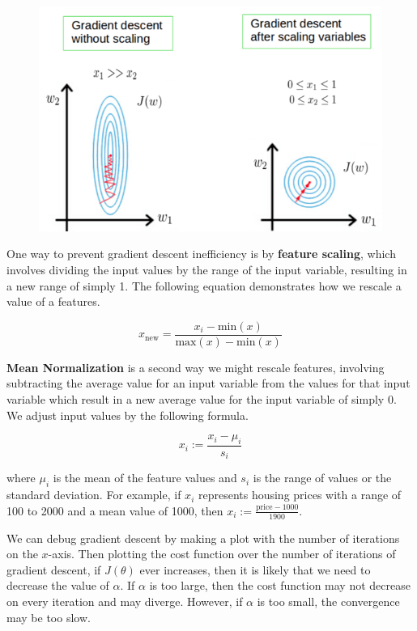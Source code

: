 \documentclass{article}
\begin{document}
        \begin{figure}[hbt!]
            \centering
            \includegraphics[scale=0.4]{Resources/Contour3}
        \end{figure}

        \noindent One way to prevent gradient descent inefficiency is by \textbf{feature scaling}, which
        involves dividing the input values by the range of the input variable, resulting in a new range of
        simply 1. The following equation demonstrates how we rescale a value of a features.

        \begin{equation*}
            x_{\text{new}} = \frac{x_i-\text{min}(x)}{\text{max}(x)-\text{min}(x)}
        \end{equation*}

        \noindent \textbf{Mean Normalization} is a second way we might rescale features, involving subtracting
        the average value for an input variable from the values for that input variable which result in a new
        average value for the input variable of simply 0. We adjust input values by the following formula.

        \begin{equation*}
            x_i := \frac{x_i - \mu_i}{s_i}
        \end{equation*}

        \noindent where $\mu_i$ is the mean of the feature values and $s_i$ is the range of values or the
        standard deviation. For example, if $x_i$ represents housing prices with a range of 100 to 2000
        and a mean value of 1000, then $x_i := \frac{\text{price}-1000}{1900}$.

        \pagebreak
        \noindent We can debug gradient descent by making a plot with the number of iterations on the $x$-axis.
        Then plotting the cost function over the number of iterations of gradient descent, if $J(\theta)$ ever
        increases, then it is likely that we need to decrease the value of $\alpha$. If $\alpha$ is too large,
        then the cost function may not decrease on every iteration and may diverge. However, if $\alpha$ is
        too small, the convergence may be too slow. \\
\end{document}
